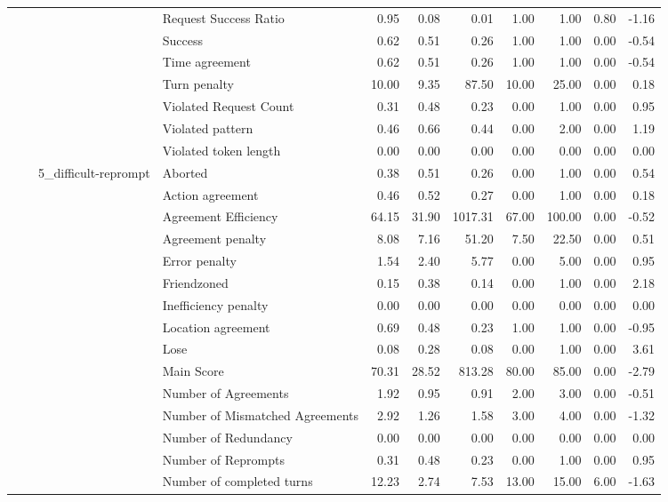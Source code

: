 \begin{tabular}{llllrrrrrrr}
 &  &  & Request Success Ratio & 0.95 & 0.08 & 0.01 & 1.00 & 1.00 & 0.80 & -1.16 \\
 &  &  & Success & 0.62 & 0.51 & 0.26 & 1.00 & 1.00 & 0.00 & -0.54 \\
 &  &  & Time agreement & 0.62 & 0.51 & 0.26 & 1.00 & 1.00 & 0.00 & -0.54 \\
 &  &  & Turn penalty & 10.00 & 9.35 & 87.50 & 10.00 & 25.00 & 0.00 & 0.18 \\
 &  &  & Violated Request Count & 0.31 & 0.48 & 0.23 & 0.00 & 1.00 & 0.00 & 0.95 \\
 &  &  & Violated pattern & 0.46 & 0.66 & 0.44 & 0.00 & 2.00 & 0.00 & 1.19 \\
 &  &  & Violated token length & 0.00 & 0.00 & 0.00 & 0.00 & 0.00 & 0.00 & 0.00 \\
\cline{3-11}
 &  & \multirow[t]{27}{*}{5_difficult-reprompt} & Aborted & 0.38 & 0.51 & 0.26 & 0.00 & 1.00 & 0.00 & 0.54 \\
 &  &  & Action agreement & 0.46 & 0.52 & 0.27 & 0.00 & 1.00 & 0.00 & 0.18 \\
 &  &  & Agreement Efficiency & 64.15 & 31.90 & 1017.31 & 67.00 & 100.00 & 0.00 & -0.52 \\
 &  &  & Agreement penalty & 8.08 & 7.16 & 51.20 & 7.50 & 22.50 & 0.00 & 0.51 \\
 &  &  & Error penalty & 1.54 & 2.40 & 5.77 & 0.00 & 5.00 & 0.00 & 0.95 \\
 &  &  & Friendzoned & 0.15 & 0.38 & 0.14 & 0.00 & 1.00 & 0.00 & 2.18 \\
 &  &  & Inefficiency penalty & 0.00 & 0.00 & 0.00 & 0.00 & 0.00 & 0.00 & 0.00 \\
 &  &  & Location agreement & 0.69 & 0.48 & 0.23 & 1.00 & 1.00 & 0.00 & -0.95 \\
 &  &  & Lose & 0.08 & 0.28 & 0.08 & 0.00 & 1.00 & 0.00 & 3.61 \\
 &  &  & Main Score & 70.31 & 28.52 & 813.28 & 80.00 & 85.00 & 0.00 & -2.79 \\
 &  &  & Number of Agreements & 1.92 & 0.95 & 0.91 & 2.00 & 3.00 & 0.00 & -0.51 \\
 &  &  & Number of Mismatched Agreements & 2.92 & 1.26 & 1.58 & 3.00 & 4.00 & 0.00 & -1.32 \\
 &  &  & Number of Redundancy & 0.00 & 0.00 & 0.00 & 0.00 & 0.00 & 0.00 & 0.00 \\
 &  &  & Number of Reprompts & 0.31 & 0.48 & 0.23 & 0.00 & 1.00 & 0.00 & 0.95 \\
 &  &  & Number of completed turns & 12.23 & 2.74 & 7.53 & 13.00 & 15.00 & 6.00 & -1.63 \\

\end{tabular}
